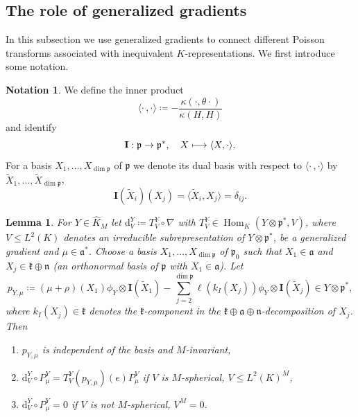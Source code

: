\documentclass[JEP,XML,SOM,NoFloatCountersInSection,Unicode,published]{cedram}
\newcommand\mto{\mathchoice{\longmapsto}{\mapsto}{\mapsto}{\mapsto}}
\newtheorem{lemma}[theorem]{Lemma}
\theoremstyle{definition}
\newtheorem{notation}[theorem]{Notation}
\newcommand{\mf}[1]{\ensuremath{\mathfrak{#1}}}
\newcommand{\on}[1]{\ensuremath{\operatorname{#1}}}
\newcommand{\Hom}[3]{\ensuremath{\on{Hom}_{#1}(#2,#3)}}
\newcommand{\rhoa}{\ensuremath{\rho}}
\newcommand{\I}{\ensuremath{\mathbf{I}}}
\newcommand{\Ik}[1]{\ensuremath{k_I(#1)}}
\begin{document}
\subsection{The role of generalized gradients}
In this subsection we use generalized gradients to connect different Poisson transforms associated with inequivalent $K$\nobreakdash-representations. We first introduce some notation.

\begin{notation}\label{not:inn_prod_dual_basis}
We define the inner product
\[
\langle\cdot\,,\cdot\rangle\coloneqq-\frac{\kappa(\cdot,\theta\cdot)}{\kappa(H,H)}
\]
and identify
\[
\I:\mf p\to\mf p^*,\quad X\mto \langle X,\cdot\rangle.
\]
For a basis $X_1,\ldots,X_{\dim\mf p}$ of $\mf p$ we denote its dual basis with respect to $\langle\cdot\,,\cdot\rangle$ by $\tilde X_1,\ldots,\tilde X_{\dim\mf p}$, \ie
\[
\I(\tilde X_i)(X_j)=\langle\tilde X_i,X_j\rangle=\delta_{ij}.
\]
\end{notation}

\begin{lemma}\label{la:gen_diffops}
For $Y\in\hat K_M$ let $\mathrm{d}_V^Y\coloneqq T_V^Y\circ\nabla$ with $T_V^Y\in\Hom{K}{Y\otimes\mf p^*}{V}$, where $V\leq L^2(K)$ denotes an irreducible subrepresentation of $Y\otimes\mf p^*$, be a generalized gradient and $\mu\in\mf a^*$. Choose a basis $X_1,\ldots,X_{\dim\mf p}$ of $\mf p_0$ such that $X_1\in\mf a$ and $X_j\in\mf k\oplus\mf n$ (\eg an orthonormal basis of $\mf p$ with $X_1\in\mf a$). Let
\[
p_{Y,\mu}\coloneqq(\mu+\rhoa)(X_1)\phi_Y\otimes\I(\tilde X_1)-\sum_{j=2}^{\dim\mf p}\ell(\Ik{X_j})\phi_Y\otimes\I(\tilde X_j)\in Y\otimes\mf p^*,
\]
where $\Ik{X_j}\in\mf k$ denotes the $\mf k$-component in the $\mf k\oplus\mf a\oplus\mf n$-decomposition of $X_j$.
Then
\begin{enumerate}
\item\label{it:gen_diffops1}$p_{Y,\mu}$ is independent of the basis and $M$-invariant,
\item\label{it:gen_diffops2} $\mathrm{d}_V^Y\circ P_\mu^Y=T_V^Y(p_{Y,\mu})(e)P_\mu^V$ if $V$ is $M$-spherical, \ie $V\leq L^2(K)^M$,
\item\label{it:gen_diffops3}$\mathrm{d}_V^Y\circ P_\mu^Y=0$ if $V$ is not $M$-spherical, \ie $V^M=0$.
\end{enumerate}
\end{lemma}
\end{document}
